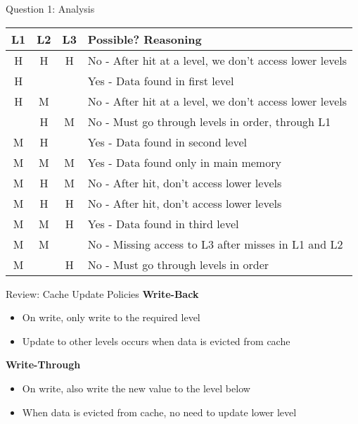 \documentclass[aspectratio=169,12pt]{beamer}
\begin{document}
\begin{frame}{Question 1: Analysis}
\begin{table}
\centering
\begin{tabular}{|c|c|c|l|}
\hline
L1 & L2 & L3 & Possible? Reasoning \\ \hline
H & H & H & No - After hit at a level, we don't access lower levels \\ \hline
H & & & Yes - Data found in first level \\ \hline
H & M & & No - After hit at a level, we don't access lower levels \\ \hline
& H & M & No - Must go through levels in order, through L1 \\ \hline
M & H & & Yes - Data found in second level \\ \hline
M & M & M & Yes - Data found only in main memory \\ \hline
M & H & M & No - After hit, don't access lower levels \\ \hline
M & H & H & No - After hit, don't access lower levels \\ \hline
M & M & H & Yes - Data found in third level \\ \hline
M & M & & No - Missing access to L3 after misses in L1 and L2 \\ \hline
M & & H & No - Must go through levels in order \\ \hline
\end{tabular}
\end{table}
\end{frame}

\begin{frame}{Review: Cache Update Policies}
\textbf{Write-Back}
\begin{itemize}
    \item On write, only write to the required level
    \item Update to other levels occurs when data is evicted from cache
\end{itemize}

\textbf{Write-Through}
\begin{itemize}
    \item On write, also write the new value to the level below
    \item When data is evicted from cache, no need to update lower level
\end{itemize}

\begin{center}
\end{center}
\end{frame}
\end{document}

